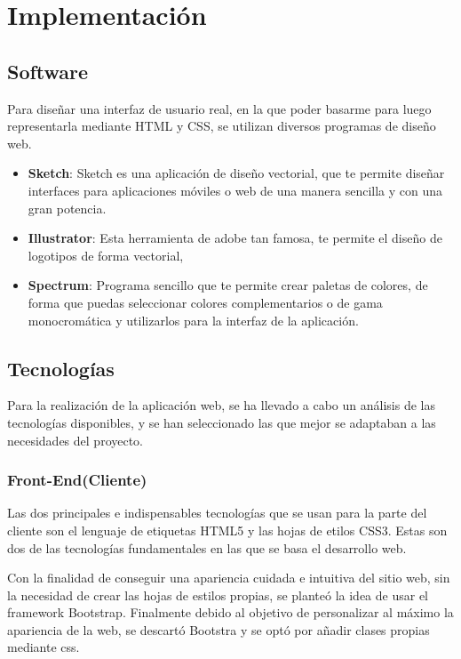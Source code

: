 \chapter{Implementación}

\section{Software}

Para diseñar una interfaz de usuario real, en la que poder basarme para luego representarla mediante HTML y CSS, se utilizan diversos programas de diseño web.

\begin{itemize}

\item \textbf{Sketch}: Sketch es una aplicación de diseño vectorial, que te permite diseñar interfaces para aplicaciones móviles o web de una manera sencilla y con una gran potencia.
\item \textbf{Illustrator}: Esta herramienta de adobe tan famosa, te permite el diseño de logotipos de forma vectorial,
\item \textbf{Spectrum}: Programa sencillo que te permite crear paletas de colores, de forma que puedas seleccionar colores complementarios o de gama monocromática y utilizarlos para la interfaz de la aplicación.

\end{itemize}

\section{Tecnologías}

Para la realización de la aplicación web, se ha llevado a cabo un análisis de las tecnologías disponibles, y se han seleccionado las que mejor se adaptaban a las necesidades del proyecto.

\subsection{Front-End(Cliente)}

Las dos principales e indispensables tecnologías que se usan para la parte del cliente son el lenguaje de etiquetas HTML5 y las hojas de etilos CSS3. Estas son dos de las tecnologías fundamentales en las que se basa el desarrollo web.

 \vspace{5 mm}

 Con la finalidad de conseguir una apariencia cuidada e intuitiva del sitio web, sin la necesidad de crear las hojas de estilos propias, se planteó la idea de usar el framework Bootstrap. Finalmente debido al objetivo de personalizar al máximo la apariencia de la web, se descartó Bootstra y se optó por añadir clases propias mediante css.

